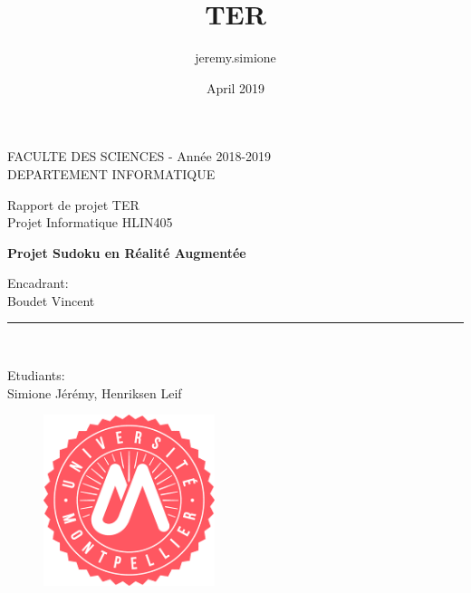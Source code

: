 \documentclass{article}
\title{TER}
\author{jeremy.simione }
\date{April 2019}
\begin{document}
\begin{titlepage}
\begin{center}
\vspace*{-1in}

FACULTE DES SCIENCES - Année 2018-2019\\
\vspace*{0.15in}
DEPARTEMENT INFORMATIQUE \\
\vspace*{0.4in}
\begin{large}
Rapport de projet TER \\
Projet Informatique HLIN405\\
\end{large}
\vspace*{0.2in}
\begin{Large}
\textbf{Projet Sudoku en Réalité Augmentée} \\
\end{Large}
\vspace*{0.3in}
\begin{large}
Encadrant:\\
Boudet Vincent
 \\
\end{large}
\vspace*{0.3in}
\rule{80mm}{0.1mm}\\
\vspace*{0.1in}
\begin{large}
Etudiants: \\
Simione Jérémy, Henriksen Leif \\
 
\end{large}
\end{center}
\begin{figure}[b]
\begin{center}
\includegraphics[width=5cm]{logo-universite-montpellier.png}
\end{center}
\end{figure}
\end{titlepage}
\end{document}

